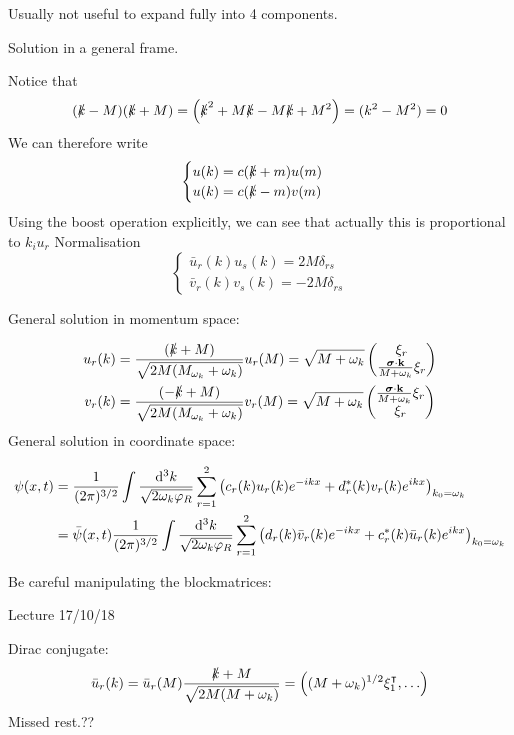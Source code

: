 Usually not useful to expand fully into 4 components.

Solution in a general frame.

Notice that
\[ (\slashed{k}-M)(\slashed{k}+M) = \left(\slashed{k}^2 + M\slashed{k} - M\slashed{k} + M^2\right) = (k^2 -M^2) = 0 \]
We can therefore write
\[ \begin{cases}
u(k) = c(\slashed{k} + m)u(m) \\
u(k) = c(\slashed{k} - m)v(m)
\end{cases} \]
Using the boost operation explicitly, we can see that actually this is proportional to $k_iu_r$
Normalisation
\[ \begin{cases}
\bar{u}_r (k)  u_s(k) = 2M\delta_{rs} \\
\bar{v}_r (k)  v_s(k) = -2M\delta_{rs} 
\end{cases} \]

General solution in momentum space:

\begin{align*}
u_r(k) &= \frac{(\slashed{k}+M)}{\sqrt{2M(M_{\omega_k}+\omega_k)}}u_r(M) = \sqrt{M+\omega_k}\begin{pmatrix}
\xi_r \\ \frac{\vec{\sigma}\cdot \vec{k}}{M+\omega_k}\xi_r
\end{pmatrix} \\
v_r(k) &= \frac{(-\slashed{k}+M)}{\sqrt{2M(M_{\omega_k}+\omega_k)}}v_r(M) = \sqrt{M+\omega_k}\begin{pmatrix}
\frac{\vec{\sigma}\cdot \vec{k}}{M+\omega_k}\xi_r \\ \xi_r
\end{pmatrix}
\end{align*}
General solution in coordinate space:

\begin{align*} \psi(x,t) &= \frac{1}{(2\pi)^{3/2}}\int \frac{\diff{^3 k}}{\sqrt{2\omega_k\varphi_R}}\sum^{2}_{r=1} \left(c_r(k)u_r(k)e^{-ikx} + d_r^*(k)v_r(k)e^{ikx}\right)_{k_0=\omega_k} \\
&= \bar{\psi}(x,t) \frac{1}{(2\pi)^{3/2}}\int \frac{\diff{^3 k}}{\sqrt{2\omega_k\varphi_R}}\sum^{2}_{r=1} \left(d_r(k)\bar{v}_r(k)e^{-ikx} + c_r^*(k)\bar{u}_r(k)e^{ikx}\right)_{k_0=\omega_k}
\end{align*}

Be careful manipulating the blockmatrices:

Lecture 17/10/18 

\begin{example}
Dirac conjugate:
\[\bar{u}_r(k) = \bar{u}_r(M) \frac{\slashed{k}+M}{\sqrt{2M(M+\omega_k)}} = \left((M+\omega_k)^{1/2}\xi^\intercal_1, \ldots\right) \]
Missed rest.??

\end{example}

